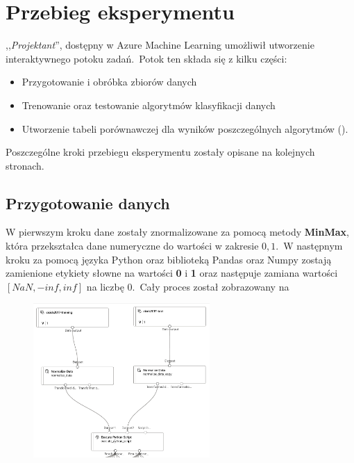 

\section{Przebieg eksperymentu}

,,\textit{Projektant}'', dostępny w Azure Machine Learning umożliwił utworzenie interaktywnego potoku zadań.\ Potok ten składa się z kilku części:
\begin{itemize}
    \item Przygotowanie i obróbka zbiorów danych
    \item Trenowanie oraz testowanie algorytmów klasyfikacji danych
    \item Utworzenie tabeli porównawczej dla wyników poszczególnych algorytmów ().
\end{itemize}

Poszczególne kroki przebiegu eksperymentu zostały opisane na kolejnych stronach.

\subsection{Przygotowanie danych}
W pierwszym kroku dane zostały znormalizowane za pomocą metody \textbf{MinMax}, która przekształca dane numeryczne do wartości w zakresie ${0, 1}$.\ W następnym kroku za pomocą języka Python oraz biblioteką Pandas oraz Numpy zostają zamienione etykiety słowne na wartości \textbf{0} i \textbf{1} oraz następuje zamiana wartości $[NaN, -inf, inf]$ na liczbę $0$.\ Cały proces został zobrazowany na 

\begin{figure}[H]
    \centering
    \includegraphics[width=0.6\textwidth]{images/norm}
    \label{fig:norm}
\end{figure}

